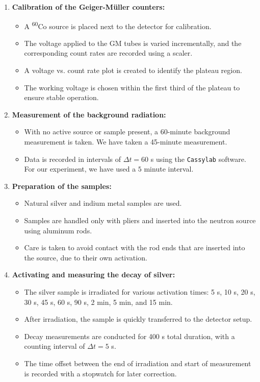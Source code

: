 \documentclass[12pt,a4paper]{article}
\begin{document}
\begin{enumerate}
  \item \textbf{Calibration of the Geiger-Müller counters:}
  \begin{itemize}
    \item A \textsuperscript{60}Co source is placed next to the detector for calibration.
    \item The voltage applied to the GM tubes is varied incrementally, and the corresponding count rates are recorded using a scaler.
    \item A voltage vs. count rate plot is created to identify the plateau region.
    \item The working voltage is chosen within the first third of the plateau to ensure stable operation.
  \end{itemize}

  \item \textbf{Measurement of the background radiation:}
  \begin{itemize}
    \item With no active source or sample present, a 60-minute background measurement is taken. We have taken a 45-minute measurement.
    \item Data is recorded in intervals of $\Delta t = 60$ s using the \texttt{Cassylab} software. For our experiment, we have used a $5$ minute interval.
  \end{itemize}

  \item \textbf{Preparation of the samples:}
  \begin{itemize}
    \item Natural silver and indium metal samples are used.
    \item Samples are handled only with pliers and inserted into the neutron source using aluminum rods.
    \item Care is taken to avoid contact with the rod ends that are inserted into the source, due to their own activation.
  \end{itemize}

  \item \textbf{Activating and measuring the decay of silver:}
  \begin{itemize}
    \item The silver sample is irradiated for various activation times: 5 s, 10 s, 20 s, 30 s, 45 s, 60 s, 90 s, 2 min, 5 min, and 15 min.
    \item After irradiation, the sample is quickly transferred to the detector setup.
    \item Decay measurements are conducted for 400 s total duration, with a counting interval of $\Delta t = 5$ s.
    \item The time offset between the end of irradiation and start of measurement is recorded with a stopwatch for later correction.
  \end{itemize}


\end{enumerate}
\end{document}

